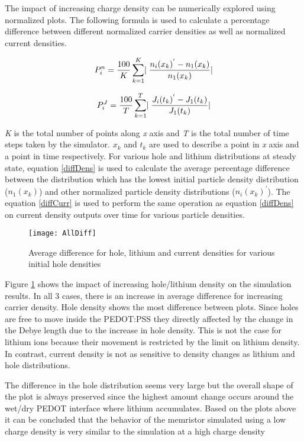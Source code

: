 \begin{doublespace}
The impact of increasing charge density can be numerically explored using normalized plots. The following formula is used to calculate a percentage difference between different normalized carrier densities as well as normalized current densities. 

\begin{equation}
\centering
P_i^{n} = \frac{100}{ K}\sum_{k=1}^{K}\lvert  \;\frac{n_{i}(x_k)^{'}-n_{1}(x_k)}{n_{1}(x_k)}\rvert
\label{diffDens}
\end{equation}

\begin{equation}
\centering
P_i^{J} = \frac{100}{ T}\sum_{k=1}^{T}\lvert  \;\frac{J_{i}(t_k)^{'}-J_{1}(t_k)}{J_{1}(t_k)}\rvert
\label{diffCurr}
\end{equation}

\textit{K} is the total number of points along \textit{x} axis and \textit{T} is the total number of time steps taken by the simulator. $x_{k}$ and $t_{k}$ are used to describe a point in \textit{x} axis and a point in time respectively. For various hole and lithium distributions at steady state, equation \ref{diffDens} is used to calculate the average percentage difference between the distribution which has the lowest initial particle density distribution ($n_{1}(x_k)$) and other normalized particle density distributions ($n_{i}(x_k)^{'}$). The equation \ref{diffCurr} is used to perform the same operation as equation \ref{diffDens} on current density outputs over time for various particle densities. 

\begin{figure}[!htp]
\centering
\texttt{[image: AllDiff]}
\caption{Average difference for hole, lithium and current densities for various initial hole densities} 
\label{AllDiff}
\end{figure}

Figure \ref{AllDiff} shows the impact of increasing hole/lithium density on the simulation results. In all 3 cases, there is an increase in average difference for increasing carrier density. Hole density shows the most difference between plots. Since holes are free to move inside the PEDOT:PSS they  directly  affected by the change in the Debye length due to the increase in hole density. This is not the case for lithium ions because their movement is restricted by the limit on lithium density. In contrast, current density is not as sensitive to density changes as lithium and hole distributions.

 The difference in the hole distribution seems very large but the overall shape of the plot is always preserved since the highest amount change occurs around the wet/dry PEDOT interface where lithium accumulates. Based on the plots above it can be concluded that the behavior of the memristor simulated using a low charge density is very similar to the simulation at a high charge density


\end{doublespace}
